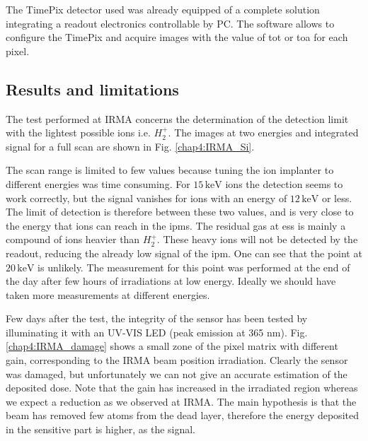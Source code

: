 \begin{refsection}
  The TimePix detector used was already equipped of a complete solution \cite{Kraus2011,advacam2019} integrating a readout electronics controllable by PC. The software allows to configure the TimePix and acquire images with the value of \acrshort{tot} or \acrshort{toa} for each pixel.

  \subsection{Results and limitations}

  The test performed at IRMA concerns the determination of the detection limit with the lightest possible ions i.e. $H_{2}^{+}$. The images at two energies and integrated signal for a full scan are shown in Fig. \ref{chap4:IRMA_Si}.
  

  
  The scan range is limited to few values because tuning the ion implanter to different energies was time consuming. For $15\,\mathrm{keV}$ ions the detection seems to work correctly, but the signal vanishes for ions with an energy of $12\,\mathrm{keV}$ or less. The limit of detection is therefore between these two values, and is very close to the energy that ions can reach in the \acrshort{ipm}s. The residual gas at \acrshort{ess} is mainly a compound of ions heavier than $H_{2}^{+}$. These heavy ions will not be detected by the readout, reducing the already low signal of the \acrshort{ipm}. One can see that the point at $20\,\mathrm{keV}$ is unlikely. The measurement for this point was performed at the end of the day after few hours of irradiations at low energy. Ideally we should have taken more measurements at different energies.

  Few days after the test, the integrity of the sensor has been tested by illuminating it with an UV-VIS LED (peak emission at 365 nm).
  Fig. \ref{chap4:IRMA_damage} shows a small zone of the pixel matrix with different gain, corresponding to the IRMA beam position irradiation.
  Clearly the sensor was damaged, but unfortunately we can not give an accurate estimation of the deposited dose. Note that the gain has increased in the irradiated region whereas we expect a reduction as we observed at IRMA. The main hypothesis is that the beam has removed few atoms from the dead layer, therefore the energy deposited in the sensitive part is higher, as the signal.


\end{refsection}
